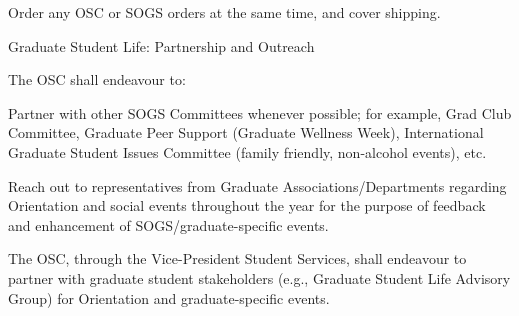 \begin{longenum}[ label*=\thesubsection.\arabic*., align=left]
\begin{longenum}[label*=\arabic*., align=left]
\begin{longenum}[label*=\arabic*., align=left]
			\item Order any OSC or SOGS orders at the same time, and cover shipping.
			\end{longenum}
		\end{longenum}
	\item Graduate Student Life: Partnership and Outreach
		\begin{longenum}[label*=\arabic*., align=left]
		\item The OSC shall endeavour to:
			\begin{longenum}[label*=\arabic*., align=left]
			\item Partner with other SOGS Committees whenever possible; for example, Grad Club Committee, Graduate Peer Support (Graduate Wellness Week), International Graduate Student Issues Committee (family friendly, non-alcohol events), etc.
			\item Reach out to representatives from Graduate Associations/Departments regarding Orientation and social events throughout the year for the purpose of feedback and enhancement of SOGS/graduate-specific events.
			\end{longenum}
		\item The OSC, through the Vice-President Student Services, shall endeavour to partner with graduate student stakeholders (e.g., Graduate Student Life Advisory Group) for Orientation and graduate-specific events.
		\end{longenum}
\end{longenum}

